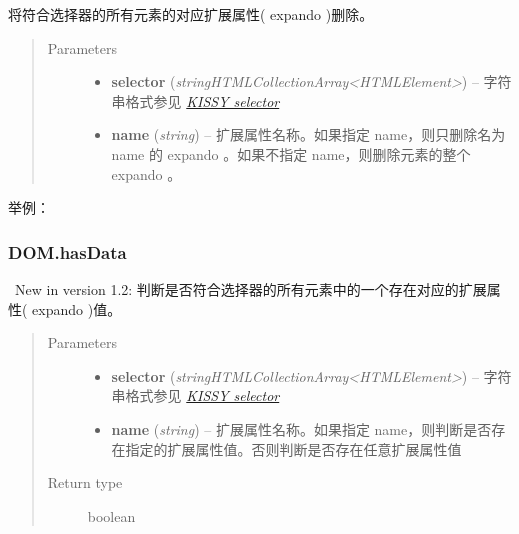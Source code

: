 \documentclass[letterpaper,10pt,english]{sphinxmanual}
\begin{document}
\begin{fulllineitems}
\label{api/core/dom/removeData:DOM.removeData}
将符合选择器的所有元素的对应扩展属性( expando )删除。
\begin{quote}\begin{description}
\item[{Parameters}] \leavevmode\begin{itemize}
\item {}
\textbf{selector} (\emph{string\textbar{}HTMLCollection\textbar{}Array\textless{}HTMLElement\textgreater{}}) -- 字符串格式参见 {\hyperref[api/core/dom/selector:dom-selector]{\emph{KISSY selector}}}

\item {}
\textbf{name} (\emph{string}) -- 扩展属性名称。如果指定 name，则只删除名为 name 的 expando 。如果不指定 name，则删除元素的整个 expando 。

\end{itemize}

\end{description}\end{quote}

\end{fulllineitems}


举例：


\subsubsection{DOM.hasData}
\label{api/core/dom/hasData:dom-hasdata}\label{api/core/dom/hasData::doc}

\begin{fulllineitems}
\label{api/core/dom/hasData:DOM.hasData}~New in version 1.2: 判断是否符合选择器的所有元素中的一个存在对应的扩展属性( expando )值。\begin{quote}\begin{description}
\item[{Parameters}] \leavevmode\begin{itemize}
\item {}
\textbf{selector} (\emph{string\textbar{}HTMLCollection\textbar{}Array\textless{}HTMLElement\textgreater{}}) -- 字符串格式参见 {\hyperref[api/core/dom/selector:dom-selector]{\emph{KISSY selector}}}

\item {}
\textbf{name} (\emph{string}) -- 扩展属性名称。如果指定 name，则判断是否存在指定的扩展属性值。否则判断是否存在任意扩展属性值

\end{itemize}

\item[{Return type}] \leavevmode
boolean

\end{description}\end{quote}

\end{fulllineitems}
\end{document}
